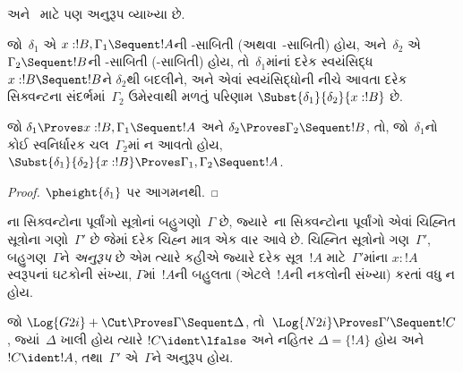  અને~
માટે પણ અનુરૂપ વ્યાખ્યા છે.

\begin{defn}
જો~$\delta_1$ એ
$x:!B, \Gamma_1 \Sequent !A$ની
-સાબિતી
(અથવા~-સાબિતી)
હોય, અને~$\delta_2$ એ
$\Gamma_2 \Sequent !B$ની
-સાબિતી
(-સાબિતી) હોય,
તો~$\delta_1$માંનાં
દરેક સ્વયંસિદ્ધ
$x:!B \Sequent !B$ને
$\delta_2$થી બદલીને,
અને એવાં સ્વયંસિદ્ધોની
નીચે આવતા દરેક સિક્વન્ટના
સંદર્ભમાં~$\Gamma_2$ ઉમેરવાથી
મળતું પરિણામ
$\Subst{\delta_1}{\delta_2}{x:!B}$
છે.
\end{defn}

\begin{prop}
જો $\delta_1 \Proves x:!B, \Gamma_1 \Sequent
!A$ અને $\delta_2 \Proves \Gamma_2 \Sequent !B$,
તો, જો~$\delta_1$નો કોઈ
સ્વનિર્ધારક ચલ~$\Gamma_2$માં
ન આવતો હોય,
$\Subst{\delta_1}{\delta_2}{x:!B} \Proves \Gamma_1, \Gamma_2 \Sequent
!A$.
\end{prop}


\begin{proof}
  $\pheight{\delta_1}$ પર આગમનથી.
\end{proof}
\endgroup

\begingroup
\makeatletter{}\makeatother


\label{guunit:OLP-0670}


ના સિક્વન્ટોના
પૂર્વાંગો સૂત્રોનાં
બહુગણો~$\Gamma$ છે,
જ્યારે~ના
સિક્વન્ટોના પૂર્વાંગો
એવાં ચિહ્નિત સૂત્રોના
ગણો~$\Gamma'$ છે
જેમાં દરેક ચિહ્ન માત્ર
એક વાર આવે છે.
ચિહ્નિત સૂત્રોનો
ગણ~$\Gamma'$,
બહુગણ~$\Gamma$ને
\emph{અનુરૂપ} છે એમ
ત્યારે કહીએ જ્યારે
દરેક સૂત્ર~$!A$
માટે~$\Gamma'$માંના
$x : !A$ સ્વરૂપનાં
ઘટકોની સંખ્યા,
$\Gamma$માં~$!A$ની
બહુલતા (એટલે~$!A$ની
નકલોની સંખ્યા)
કરતાં વધુ ન હોય.

\begin{prop}
જો $\Log{G2i} + \Cut \Proves \Gamma \Sequent \Delta$,
તો~$\Log{N2i}
\Proves \Gamma' \Sequent !C$,
જ્યાં~$\Delta$ ખાલી
હોય ત્યારે
$!C \ident \lfalse$
અને નહિતર
$\Delta = \{!A\}$ હોય અને $!C \ident !A$,
તથા~$\Gamma'$ એ~$\Gamma$ને
અનુરૂપ હોય.
\end{prop}

